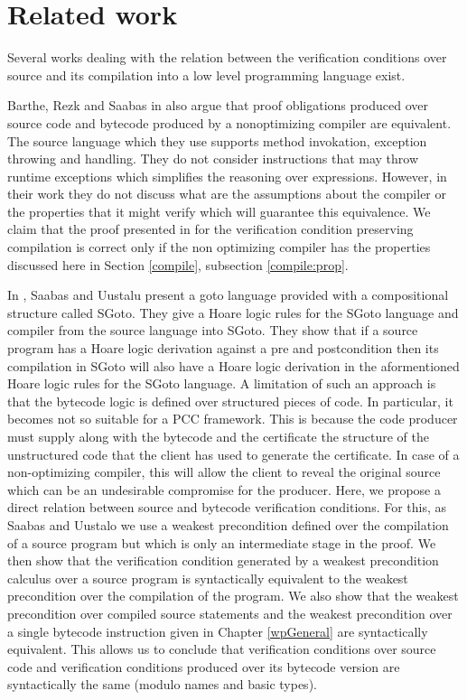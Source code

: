 \section{Related work}\label{pog:relWork}


Several works dealing with the relation between the 
verification conditions over source and its compilation into a low  level  programming  language exist.

Barthe, Rezk and Saabas in \cite{gta05:fast} also argue that proof obligations produced
over source code and
bytecode produced by a nonoptimizing compiler   are equivalent.
The source language which they use supports method invokation, exception throwing and handling. 
They do not consider instructions that may throw runtime exceptions which simplifies the reasoning over expressions. 
 However, in their work they do not discuss  what are the  assumptions about the compiler 
or the  properties that it might verify  which will guarantee this equivalence.
 We claim that the proof presented in \cite{gta05:fast} for
 the verification condition preserving compilation is correct only if the non optimizing 
 compiler has the properties discussed here in Section \ref{compile}, subsection \ref{compile:prop}.


In \cite{SU05CNS}, Saabas and Uustalu present a goto language provided with a compositional structure called SGoto.
They give a Hoare logic rules for the SGoto language and compiler from the source language into SGoto.
They show that if a source program has a Hoare logic derivation
 against a pre and postcondition then its compilation in SGoto will also have a Hoare
 logic derivation in the aformentioned Hoare logic rules for the SGoto language. 
A limitation of such an approach is that the bytecode logic is defined over structured pieces of code. In particular,
it becomes not so suitable for  a  PCC framework. This is because the code producer must supply along with the 
bytecode and the certificate the structure of the unstructured code that the client has used to
 generate the certificate. In case of a non-optimizing compiler, this will allow the client to reveal the original source 
which can be an undesirable compromise for the producer. 
Here, we propose a direct relation between source and bytecode verification conditions. 
 For this, as Saabas and Uustalo we use a  weakest precondition defined over the compilation of a source program 
but which is only an intermediate stage in the proof. 
We then show that the verification condition generated by
a weakest precondition calculus over a source program is syntactically equivalent to the 
weakest precondition over the compilation of the program. We also show that the weakest precondition over compiled source statements
and the weakest precondition over a single bytecode instruction given in Chapter \ref{wpGeneral} are syntactically equivalent.
This allows us to conclude that verification conditions over source code and verification conditions produced over its bytecode version
are syntactically the same (modulo names and basic types).

